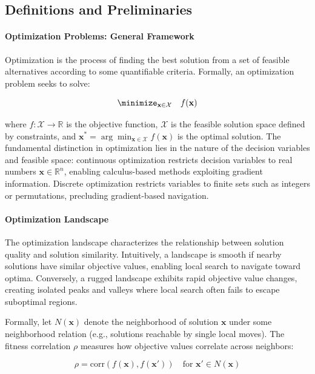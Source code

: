 \subsection{Definitions and Preliminaries}

\paragraph{Optimization Problems: General Framework}

Optimization is the process of finding the best solution from a set of feasible alternatives according to some quantifiable criteria. Formally, an optimization problem seeks to solve:

\begin{equation}
\minimize_{\mathbf{x} \in \mathcal{X}} \quad f(\mathbf{x})
\end{equation}

where $f: \mathcal{X} \to \mathbb{R}$ is the objective function, $\mathcal{X}$ is the feasible solution space defined by constraints, and $\mathbf{x}^* = \arg\min_{\mathbf{x} \in \mathcal{X}} f(\mathbf{x})$ is the optimal solution. The fundamental distinction in optimization lies in the nature of the decision variables and feasible space: continuous optimization restricts decision variables to real numbers $\mathbf{x} \in \mathbb{R}^n$, enabling calculus-based methods exploiting gradient information. Discrete optimization restricts variables to finite sets such as integers or permutations, precluding gradient-based navigation.

\paragraph{Optimization Landscape}

The optimization landscape characterizes the relationship between solution quality and solution similarity. Intuitively, a landscape is smooth if nearby solutions have similar objective values, enabling local search to navigate toward optima. Conversely, a rugged landscape exhibits rapid objective value changes, creating isolated peaks and valleys where local search often fails to escape suboptimal regions.

Formally, let $N(\mathbf{x})$ denote the neighborhood of solution $\mathbf{x}$ under some neighborhood relation (e.g., solutions reachable by single local moves). The fitness correlation $\rho$ measures how objective values correlate across neighbors:

\begin{equation}
\rho = \text{corr}(f(\mathbf{x}), f(\mathbf{x}'))  \quad \text{for } \mathbf{x}' \in N(\mathbf{x})
\end{equation}

